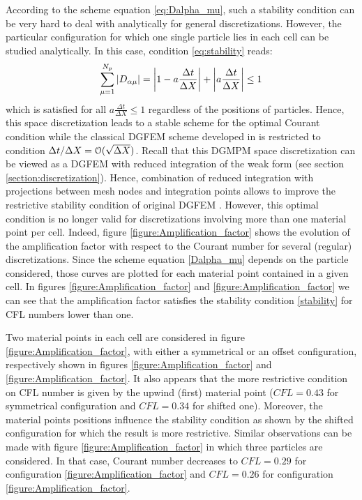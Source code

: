 According to the scheme equation \eqref{eq:Dalpha_mu}, such a stability condition can be very hard to deal with analytically for general discretizations. However, the particular configuration for which one single particle lies in each cell can be studied analytically. In this case, condition \eqref{eq:stability} reads:
\begin{equation}
\sum_{\mu=1}^{N_p} \left\vert D_{\alpha\mu}\right\vert = \left\vert1 - a\frac{\Delta t}{\Delta X} \right\vert +  \left\vert a\frac{\Delta t}{\Delta X} \right\vert \leq 1 \label{eq:1ppc_stab}
\end{equation}
which is satisfied for all $a\frac{\Delta t}{\Delta X} \leq 1$ regardless of the positions of particles.
Hence, this space discretization leads to a stable scheme for the optimal Courant condition while the classical DGFEM scheme developed in \cite{Chavent_Salzano} is restricted to condition $\Delta t / \Delta X = \mathcal{O}(\sqrt{\Delta X})$. Recall that this DGMPM space discretization can be viewed as a DGFEM with reduced integration of the weak form (see section \ref{section:discretization}). Hence, combination of reduced integration with projections between mesh nodes and integration points allows to improve the restrictive stability condition of original DGFEM \cite{Chavent_Salzano,NeutronDG}. However, this optimal condition is no longer valid for discretizations involving more than one material point per cell. Indeed, figure \ref{figure:Amplification_factor} shows the evolution of the amplification factor with respect to the Courant number for several (regular) discretizations. Since the scheme equation \eqref{Dalpha_mu} depends on the particle considered, those curves are plotted for each material point contained in a given cell. In figures \ref{figure:Amplification_factor} and \ref{figure:Amplification_factor} we can see that the amplification factor satisfies the stability condition \eqref{stability} for CFL numbers lower than one.

Two material points in each cell are considered in figure \ref{figure:Amplification_factor}, with either a symmetrical or an offset configuration, respectively shown in figures \ref{figure:Amplification_factor} and \ref{figure:Amplification_factor}. It also appears that the more restrictive condition on CFL number is given by the upwind (first) material point ($CFL=0.43$ for symmetrical configuration and $CFL=0.34$ for shifted one). Moreover, the material points positions influence the stability condition as shown by the shifted configuration for which the result is more restrictive. Similar observations can be made with figure \ref{figure:Amplification_factor} in which three particles are considered. In that case, Courant number decreases to $CFL=0.29$ for configuration \ref{figure:Amplification_factor} and $CFL=0.26$ for configuration \ref{figure:Amplification_factor}. 

